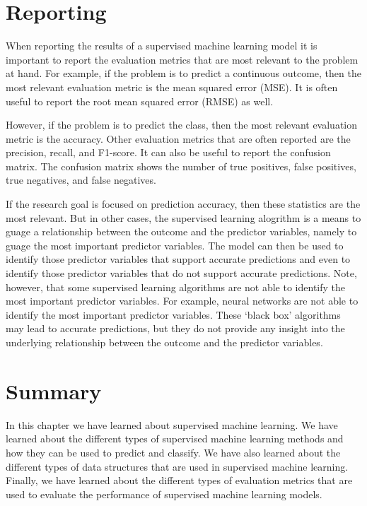 \documentclass[
  letterpaper,
]{latex/krantz}
\begin{document}
\hypertarget{pda-reporting}{%
\section{Reporting}\label{pda-reporting}}

When reporting the results of a supervised machine learning model it is
important to report the evaluation metrics that are most relevant to the
problem at hand. For example, if the problem is to predict a continuous
outcome, then the most relevant evaluation metric is the mean squared
error (MSE). It is often useful to report the root mean squared error
(RMSE) as well.

However, if the problem is to predict the class, then the most relevant
evaluation metric is the accuracy. Other evaluation metrics that are
often reported are the precision, recall, and F1-score. It can also be
useful to report the confusion matrix. The confusion matrix shows the
number of true positives, false positives, true negatives, and false
negatives.

If the research goal is focused on prediction accuracy, then these
statistics are the most relevant. But in other cases, the supervised
learning alogrithm is a means to guage a relationship between the
outcome and the predictor variables, namely to guage the most important
predictor variables. The model can then be used to identify those
predictor variables that support accurate predictions and even to
identify those predictor variables that do not support accurate
predictions. Note, however, that some supervised learning algorithms are
not able to identify the most important predictor variables. For
example, neural networks are not able to identify the most important
predictor variables. These `black box' algorithms may lead to accurate
predictions, but they do not provide any insight into the underlying
relationship between the outcome and the predictor variables.

\hypertarget{pda-summary}{%
\section{Summary}\label{pda-summary}}

In this chapter we have learned about supervised machine learning. We
have learned about the different types of supervised machine learning
methods and how they can be used to predict and classify. We have also
learned about the different types of data structures that are used in
supervised machine learning. Finally, we have learned about the
different types of evaluation metrics that are used to evaluate the
performance of supervised machine learning models.
\end{document}
